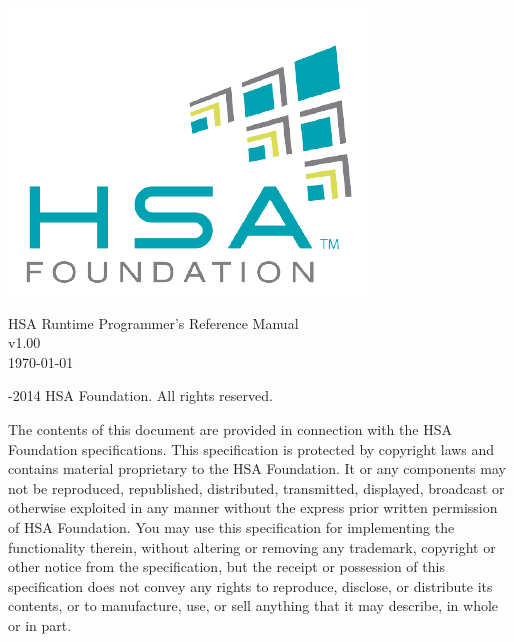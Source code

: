 \documentclass[final,oneside]{book}
\newcommand{\doctitle}{HSA Runtime Programmer's Reference Manual}
\begin{document}
\providecommand{\DIFadd}[1]{{\protect\color{Cerulean}#1}}
\renewcommand{\DIFadd}[1]{{\protect\color{Cerulean}#1}}

\providecommand{\DIFdel}[1]{{\protect\color{red}\sout{\mbox{#1}}}}
\renewcommand{\DIFdel}[1]{{\protect\color{red}\sout{\mbox{#1}}}}


\begin{titlepage}
\includegraphics[width=.4\textwidth]{fig/foundation.png}
\vspace*{7cm}
\begin{center}
{\Large \doctitle\\[1ex]\large v1.00}\\ %
\vspace*{1cm}
\vspace*{0.5cm}
{\small \today}
\end{center}
\end{titlepage}
\thispagestyle{empty} {-2014 HSA Foundation. All rights
  reserved.}


The contents of this document are provided in connection with the HSA Foundation
specifications. This specification is protected by copyright laws and contains
material proprietary to the HSA Foundation. It or any components may not be
reproduced, republished, distributed, transmitted, displayed, broadcast or
otherwise exploited in any manner without the express prior written permission
of HSA Foundation. You may use this specification for implementing the
functionality therein, without altering or removing any trademark, copyright or
other notice from the specification, but the receipt or possession of this
specification does not convey any rights to reproduce, disclose, or distribute
its contents, or to manufacture, use, or sell anything that it may describe, in
whole or in part.
\end{document}

